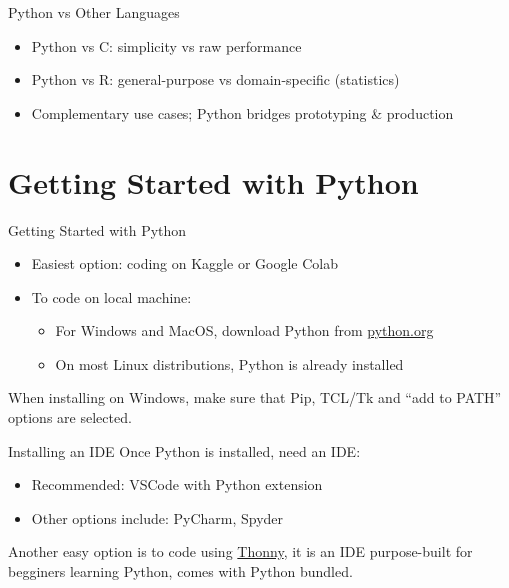 \documentclass[12pt, aspectratio=169]{beamer}
\begin{document}
    \begin{frame}{Python vs Other Languages}
        \begin{itemize}
            \item Python vs C: simplicity vs raw performance
            \item Python vs R: general-purpose vs domain-specific (statistics)
            \item Complementary use cases; Python bridges prototyping \& production
        \end{itemize}
    \end{frame}


    \section{Getting Started with Python}

    \begin{frame}{Getting Started with Python}
        \begin{itemize}
            \item Easiest option: coding on Kaggle or Google Colab
            \item To code on local machine:
            \begin{itemize}
                \item For Windows and MacOS, download Python from \href{https://www.python.org/}{python.org}
                \item On most Linux distributions, Python is already installed
            \end{itemize}
        \end{itemize}

        When installing on Windows, make sure that Pip, TCL/Tk and ``add to PATH'' options are selected.
    \end{frame}

    \begin{frame}{Installing an IDE}
        Once Python is installed, need an IDE:
        \begin{itemize}
            \item Recommended: VSCode with Python extension
            \item Other options include: PyCharm, Spyder
        \end{itemize}

        Another easy option is to code using \href{https://thonny.org/}{Thonny}, it is an IDE purpose-built for begginers learning Python, comes with Python bundled.
    \end{frame}
\end{document}
